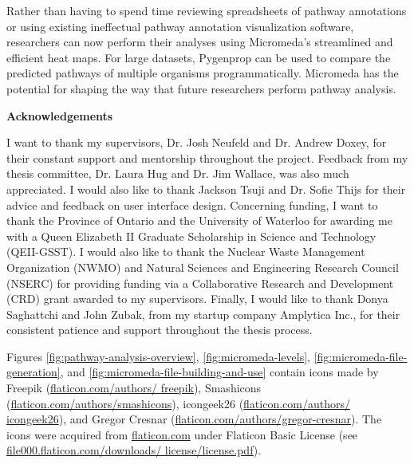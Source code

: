 Rather than having to spend time reviewing spreadsheets of pathway annotations 
or using existing ineffectual pathway annotation visualization software, 
researchers can now perform their analyses using Micromeda's streamlined and 
efficient heat maps. For large datasets, Pygenprop can be used to compare the 
predicted pathways of multiple organisms programmatically. Micromeda has the 
potential for shaping the way that future researchers perform pathway analysis.

\cleardoublepage


\begin{center}\textbf{Acknowledgements}\end{center}

I want to thank my supervisors, Dr. Josh Neufeld and Dr. Andrew Doxey, for their 
constant support and mentorship throughout the project. Feedback from my thesis 
committee, Dr. Laura Hug and Dr. Jim Wallace, was also much appreciated. I would 
also like to thank Jackson Tsuji and Dr. Sofie Thijs for their advice and 
feedback on user interface design. Concerning funding, I want to thank the 
Province of Ontario and the University of Waterloo for awarding me with a Queen 
Elizabeth II Graduate Scholarship in Science and Technology (QEII-GSST). I would 
also like to thank the Nuclear Waste Management Organization (NWMO) and Natural 
Sciences and Engineering Research Council (NSERC) for providing funding via a 
Collaborative Research and Development (CRD) grant awarded to my supervisors. 
Finally, I would like to thank Donya Saghattchi and John Zubak, from my startup 
company Amplytica Inc., for their consistent patience and support throughout the 
thesis process.

Figures \ref{fig:pathway-analysis-overview}, \ref{fig:micromeda-levels}, 
\ref{fig:micromeda-file-generation}, and 
\ref{fig:micromeda-file-building-and-use} contain icons made by Freepik 
(\href{http://flaticon.com/authors/freepik}{flaticon.com/authors/ freepik}), 
Smashicons 
(\href{http://flaticon.com/authors/smashicons}{flaticon.com/authors/smashicons}), 
icongeek26 (\href{http://flaticon.com/authors/icongeek26}{flaticon.com/authors/ 
icongeek26}), and Gregor Cresnar 
(\href{http://flaticon.com/authors/gregor-cresnar}{flaticon.com/authors/gregor-cresnar}). 
The icons were acquired from \href{http://flaticon.com}{flaticon.com} under 
Flaticon Basic License (see \href{http://file000.flaticon.com/downloads/license/ 
license.pdf}{file000.flaticon.com/downloads/ license/license.pdf}).

